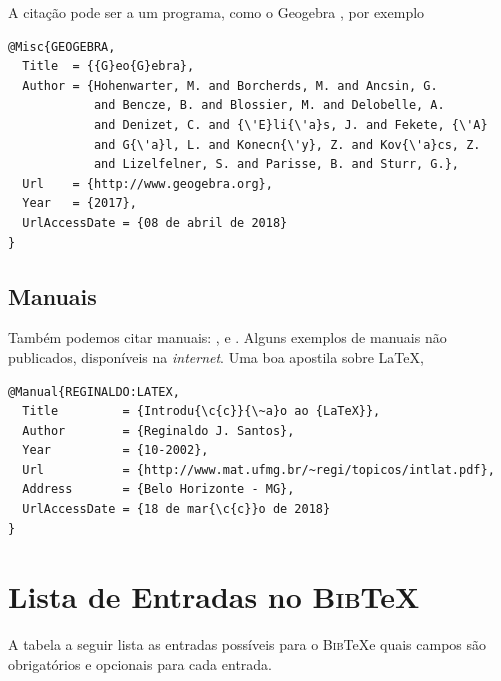 \documentclass[fleqn]{icat-ufal}
\newcommand{\BibTeX}   {\textsc{Bib}\TeX}
\begin{document}
A citação pode ser a um programa, como o Geogebra \cite{GEOGEBRA}, por exemplo
\begin{lstlisting}
@Misc{GEOGEBRA,
  Title  = {{G}eo{G}ebra},
  Author = {Hohenwarter, M. and Borcherds, M. and Ancsin, G. 
            and Bencze, B. and Blossier, M. and Delobelle, A. 
            and Denizet, C. and {\'E}li{\'a}s, J. and Fekete, {\'A} 
            and G{\'a}l, L. and Konecn{\'y}, Z. and Kov{\'a}cs, Z. 
            and Lizelfelner, S. and Parisse, B. and Sturr, G.},
  Url    = {http://www.geogebra.org},
  Year   = {2017},
  UrlAccessDate = {08 de abril de 2018}
}
\end{lstlisting}

\subsection{Manuais}

Também podemos citar manuais:
\citeauthor{REGINALDO:LATEX}, 
\citeauthor{MARCIO:LATEX} e
\citeauthor{RANIERE:LATEX}.
Alguns exemplos de manuais não publicados, disponíveis na \textit{internet}.
Uma boa apostila sobre \LaTeX, \cite{REGINALDO:LATEX}
\begin{lstlisting}
@Manual{REGINALDO:LATEX,
  Title         = {Introdu{\c{c}}{\~a}o ao {LaTeX}},
  Author        = {Reginaldo J. Santos},
  Year          = {10-2002},
  Url           = {http://www.mat.ufmg.br/~regi/topicos/intlat.pdf},
  Address       = {Belo Horizonte - MG},
  UrlAccessDate = {18 de mar{\c{c}}o de 2018}
}
\end{lstlisting}

\section{Lista de Entradas no \BibTeX}

A tabela a seguir lista as entradas possíveis para o \BibTeX e quais campos são
obrigatórios e opcionais para cada entrada.
\end{document}
